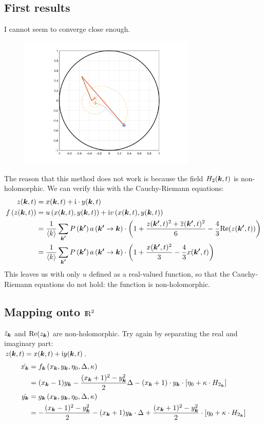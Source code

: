 \subsection{First results}
I cannot seem to converge close enough.
\begin{figure}[H]
\centering
\includegraphics[width = 0.75\textwidth]{../Figures/ProblemsWithNewtonRaphson.png}
\end{figure}

The reason that this method does not work is because the field $H_2({\boldsymbol{k}},t)$ is non-holomorphic. We can verify this with the Cauchy-Riemann equations:
\begin{align*}
z({\boldsymbol{k}},t) &= x({\boldsymbol{k}},t) + {\rm{i}} \cdot y({\boldsymbol{k}},t)\\
f\left( z({\boldsymbol{k}},t) \right) &= u\left(x({\boldsymbol{k}}, t), y({\boldsymbol{k}}, t) \right) + {\rm{i}} v\left(x({\boldsymbol{k}}, t), y({\boldsymbol{k}}, t) \right)\\
&= \frac{1}{{\langle k\rangle}} \sum_{{\boldsymbol{k'}}} P\left({\boldsymbol{k'}}\right) a\left({\boldsymbol{k'}} \rightarrow {\boldsymbol{k}}\right) \cdot \left( 1 + \frac{z({\boldsymbol{k'}}, t)^2 + \overline{z}({\boldsymbol{k'}}, t)^2}{6} - \frac{4}{3} {\operatorname{Re}}(z({\boldsymbol{k'}}, t)) \right)\\
&= \frac{1}{{\langle k\rangle}} \sum_{{\boldsymbol{k'}}} P\left({\boldsymbol{k'}}\right) a\left({\boldsymbol{k'}} \rightarrow {\boldsymbol{k}}\right) \cdot \left( 1 + \frac{x({\boldsymbol{k'}}, t)^2}{3} - \frac{4}{3} x({\boldsymbol{k'}}, t) \right)
\end{align*}
This leaves us with only $u$ defined as a real-valued function, so that the Cauchy-Riemann equations do not hold: the function is non-holomorphic. 
 
\subsection{Mapping onto ${\rm I\!R}^2$}
$\bar{z}_{{\boldsymbol{k}}}$ and ${\operatorname{Re}}(z_{{\boldsymbol{k}}})$ are non-holomorphic. Try again by separating the real and imaginary part: \\
$z({\boldsymbol{k}},t) = x({\boldsymbol{k}},t) + {\rm{i}} y({\boldsymbol{k}},t)$.
\begin{align*}
\dot{x_{{\boldsymbol{k}}}} 
&=f_{{\boldsymbol{k}}} \left(x_{{\boldsymbol{k}}}, y_{{\boldsymbol{k}}}, \eta_{0}, \Delta, \kappa \right) \\ 
&=(x_{{\boldsymbol{k}}}-1) y_{{\boldsymbol{k}}}-\frac{(x_{{\boldsymbol{k}}}+1)^{2}-y_{{\boldsymbol{k}}}^{2}}{2} \Delta-(x_{{\boldsymbol{k}}}+1) \cdot y_{{\boldsymbol{k}}} \cdot \left[\eta_{0}+ \kappa \cdot H_{2_{{\boldsymbol{k}}}}\right] \\ 
\dot{y_{{\boldsymbol{k}}}} &= g_{{\boldsymbol{k}}} \left(x_{{\boldsymbol{k}}}, y_{{\boldsymbol{k}}}, \eta_{0}, \Delta, \kappa \right) \\ 
&=-\frac{(x_{{\boldsymbol{k}}}-1)^{2}-y_{{\boldsymbol{k}}}^{2}}{2}-(x_{{\boldsymbol{k}}}+1) y_{{\boldsymbol{k}}} \cdot \Delta+\frac{(x_{{\boldsymbol{k}}}+1)^{2}-y_{{\boldsymbol{k}}}^{2}}{2} \cdot \left[\eta_{0} + \kappa \cdot H_{2_{{\boldsymbol{k}}}} \right] 
\end{align*}

